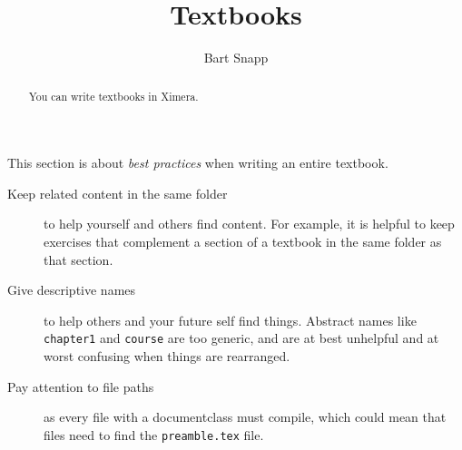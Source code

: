 \documentclass{ximera}
\title{Textbooks}
\author{Bart Snapp}
\begin{document}
\begin{abstract}
  You can write textbooks in Ximera.
\end{abstract}
\maketitle
This section is about \textit{best practices} when writing an entire
textbook.
\begin{description}
  \item[Keep related content in the same folder] to help yourself and
    others find content. For example, it is helpful to keep exercises that
    complement a section of a textbook in the same folder as that section.
  \item[Give descriptive names] to help others and your future self find things.
    Abstract names like \verb!chapter1! and \verb!course! are too generic, and
    are
    at best unhelpful and at worst confusing when things are rearranged.
  \item[Pay attention to file paths] as every file with a documentclass must
    compile, which could mean that files need to find the \verb!preamble.tex! file.
\end{description}

\pdfOnly{\end{multicols}}
\end{document}
